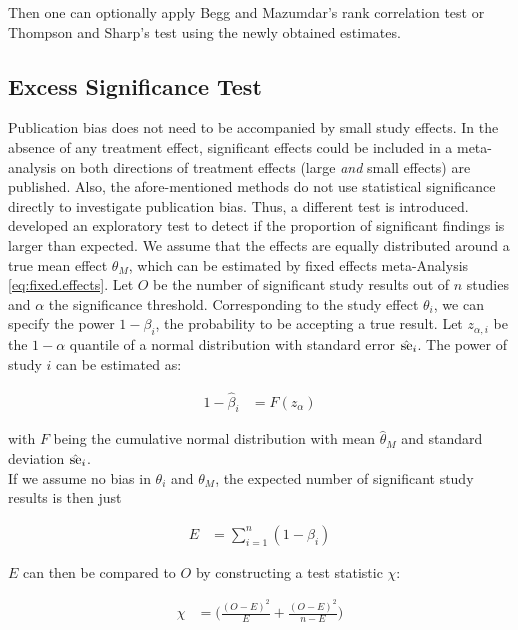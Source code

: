 \documentclass[11pt,a4paper,twoside]{book}\usepackage[]{graphicx}\usepackage[]{color}
\begin{document}
Then one can optionally apply Begg and Mazumdar's rank correlation test or Thompson and Sharp's test using the newly obtained estimates.


\subsection{Excess Significance Test} \label{sec:excess.significance}
Publication bias does not need to be accompanied by small study effects. In the absence of any treatment effect, significant effects could be included in a meta-analysis on both directions of treatment effects (\ie large \textit{and} small effects) are published. Also, the afore-mentioned methods do not use statistical significance directly to investigate publication bias. Thus, a different test is introduced. \\
\citealp{excess.significance} developed an exploratory test to detect if the proportion of significant findings is larger than expected. 
We assume that the effects are equally distributed around a true mean effect $\theta_M$, which can be estimated by fixed effects meta-Analysis \eqref{eq:fixed.effects}. Let $O$ be the number of significant study results out of $n$ studies and $\alpha$ the significance threshold. Corresponding to the study effect $\theta_i$, we can specify the power $1 - \beta_i$, the probability to be accepting a true result. Let $z_{\alpha,i}$ be the $1-\alpha$ quantile of a normal distribution with standard error $\hat{\operatorname{se}}_i$. The power of study $i$ can be estimated as:

\begin{align}
1 - \hat{\beta}_i &= F(z_\alpha) 
\end{align}

with $F$ being the cumulative normal distribution with mean $\hat{\theta}_M$ and standard deviation $\hat{\operatorname{se}}_i$. \\
If we assume no bias in $\theta_i$ and $\theta_M$, the expected number of significant study results is then just

\begin{align}
E &= \sum_{i = 1}^n (1 - \beta_i) \nonumber
\end{align}

$E$ can then be compared to $O$ by constructing a test statistic $\chi$:

\begin{align}
\chi  &= \bigg( \frac{(O - E)^2}{E} + \frac{(O - E)^2}{n - E}\bigg) \nonumber
\end{align}
\end{document}
